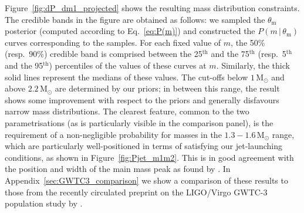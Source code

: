 \documentclass[]{aa}
\newcommand{\resp}[1]{#1}
\begin{document}
Figure~\ref{fig:dP_dm1_projected} shows the resulting mass distribution constraints. \resp{The credible bands in the figure are obtained as follows: we sampled the $\theta_\mathrm{m}$ posterior (computed according to Eq.~\ref{eq:P(m)}) and constructed the $P(m\,|\,\theta_\mathrm{m})$ curves corresponding to the samples. For each fixed value of $m$, the 50\% (resp.\ 90\%) credible band is comprised between the 25$^\mathrm{th}$ and the 75$^\mathrm{th}$ (resp.\ 5$^\mathrm{th}$ and the 95$^\mathrm{th}$) percentiles of the values of these curves at $m$. Similarly, the thick solid lines represent the medians of these values}. The cut-offs below $1\,\mathrm{M_\odot}$ and above $2.2\,\mathrm{M_\odot}$ are determined by our priors; in between this range, the result shows some improvement with respect to the priors and generally disfavours narrow mass distributions. The clearest feature, common to the two parametrisations (as is particularly visible in the comparison panel), is the requirement of a non-negligible probability for masses in the $1.3-1.6\,\mathrm{M_\odot}$ range, which are particularly well-positioned in terms of satisfying our jet-launching conditions, as shown in Figure~\ref{fig:Pjet_m1m2}. This is in good agreement with the position and width of the main mass peak as found by \citet{Galaudage2021}. In Appendix~\ref{sec:GWTC3_comparison} we show a comparison of these results to those from the recently circulated preprint on the LIGO/Virgo GWTC-3 population study by \citet{LVC2021_GWTC3pop}.
 
\end{document}
